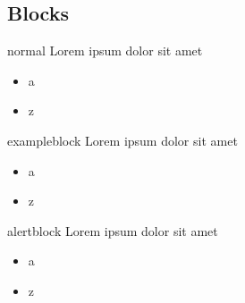 \documentclass[9pt,english]{Beamer_PROMES}\uselanguage{English}\languagepath{English}
\begin{document}
\subsection{Blocks}
\begin{frame}

\begin{block}{normal}
   Lorem ipsum dolor sit amet
   \begin{itemize}
      \item a
      \item z
   \end{itemize}
\end{block}

\begin{exampleblock}{exampleblock}
   Lorem ipsum dolor sit amet
   \begin{itemize}
      \item a
      \item z
   \end{itemize}
\end{exampleblock}

\begin{alertblock}{alertblock}
   Lorem ipsum dolor sit amet
   \begin{itemize}
      \item a
      \item z
   \end{itemize}
\end{alertblock}

\end{frame}
\end{document}
